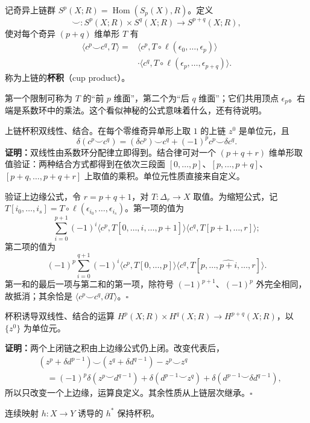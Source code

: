 记奇异上链群 $S^p(X;R)=\operatorname{Hom}(S_p(X),R)$。定义
\[
\smile:S^p(X;R)\times S^q(X;R)\to S^{p+q}(X;R),
\]
使对每个奇异 $(p+q)$ 维单形 $T$ 有
\[
\begin{split}
\langle c^p\smile c^q,T\rangle
={}&\langle c^p,T\circ\ell(\epsilon_0,\ldots,\epsilon_p)\rangle\\
&\cdot\langle c^q,T\circ\ell(\epsilon_p,\ldots,\epsilon_{p+q})\rangle.
\end{split}\tag{*}
\]
称为上链的\textbf{杯积}（cup product）。

第一个限制可称为 $T$ 的“前 $p$ 维面”，第二个为“后 $q$ 维面”；它们共用顶点 $\epsilon_p$。右端是系数环中的乘法。这个看似神秘的公式意味着什么，还有待说明。

上链杯积双线性、结合。在每个零维奇异单形上取 $1$ 的上链 $z^0$ 是单位元，且
\[
\delta(c^p\smile c^q)=(\delta c^p)\smile c^q+(-1)^pc^p\smile\delta c^q.
\]
\textbf{证明：}双线性由系数环分配律立即得到。结合律可对一个 $(p+q+r)$ 维单形取值验证：两种结合方式都得到在依次三段面 $[0,\ldots,p]$、$[p,\ldots,p+q]$、$[p+q,\ldots,p+q+r]$ 上取值的乘积。单位元性质直接来自定义。

验证上边缘公式，令 $r=p+q+1$，对 $T:\Delta_r\to X$ 取值。为缩短公式，记 $T[i_0,\ldots,i_s]=T\circ\ell(\epsilon_{i_0},\ldots,\epsilon_{i_s})$。第一项的值为
\[
\sum_{i=0}^{p+1}(-1)^i\langle c^p,T[0,\ldots,\widehat i,\ldots,p+1]\rangle
\langle c^q,T[p+1,\ldots,r]\rangle;
\]
第二项的值为
\[
(-1)^p\sum_{i=0}^{q+1}(-1)^i\langle c^p,T[0,\ldots,p]\rangle
\langle c^q,T[p,\ldots,\widehat{p+i},\ldots,r]\rangle.
\]
第一和的最后一项与第二和的第一项，除符号 $(-1)^{p+1}$、$(-1)^p$ 外完全相同，故抵消；其余恰是 $\langle c^p\smile c^q,\partial T\rangle$。\hfill$\square$

杯积诱导双线性、结合的运算 $H^p(X;R)\times H^q(X;R)\to H^{p+q}(X;R)$，以 $\{z^0\}$ 为单位元。

\textbf{证明：}两个上闭链之积由上边缘公式仍上闭。改变代表后，
\begin{align*}
&(z^p+\delta d^{p-1})\smile(z^q+\delta d^{q-1})-z^p\smile z^q\\
&\quad=(-1)^p\delta(z^p\smile d^{q-1})
+\delta(d^{p-1}\smile z^q)+\delta(d^{p-1}\smile\delta d^{q-1}),
\end{align*}
所以只改变一个上边缘，运算良定义。其余性质从上链层次继承。\hfill$\square$

连续映射 $h:X\to Y$ 诱导的 $h^*$ 保持杯积。

